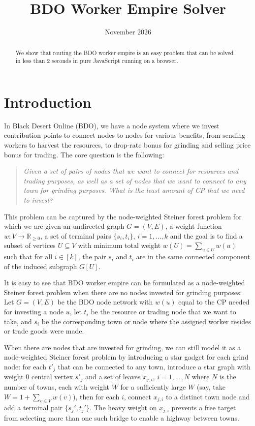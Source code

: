 \documentclass[11pt]{article}
\title{BDO Worker Empire Solver}
\date{November 2026}
\theoremstyle{definition}
\theoremstyle{remark}
\newcommand{\R}{\mathbb{R}}
\begin{document}
\maketitle

\begin{abstract}
    We show that routing the BDO worker empire is an easy problem that can be solved in less than 2 seconds in pure JavaScript running on a browser.
\end{abstract}
    

\section{Introduction}
In Black Desert Online (BDO), we have a node system where we invest contribution points to connect nodes to nodes for various benefits, from sending workers to harvest the resources, to drop-rate bonus for grinding and selling price bonus for trading. The core question is the following:

\begin{quote}
    \emph{Given a set of pairs of nodes that we want to connect for resources and trading purposes, as well as a set of nodes that we want to connect to any town for grinding purposes. What is the least amount of CP that we need to invest?}
\end{quote}

This problem can be captured by the node-weighted Steiner forest problem for which we are given an undirected graph $G = (V, E)$, a weight function $w: V \to \R_{\ge 0}$, a set of terminal pairs $\{s_i, t_i\}$, $i = 1, \dots, k$ and the goal is to find a subset of vertices $U \subseteq V$ with minimum total weight $w(U) = \sum_{u \in U} w(u)$ such that for all $i \in [k]$, the pair $s_i$ and $t_i$ are in the same connected component of the induced subgraph $G[U]$.

It is easy to see that BDO worker empire can be formulated as a node-weighted Steiner forest problem when there are no nodes invested for grinding purposes: Let $G = (V, E)$ be the BDO node network with $w(u)$ equal to the CP needed for investing a node $u$, let $t_i$ be the resource or trading node that we want to take, and $s_i$ be the corresponding town or node where the assigned worker resides or trade goods were made.

When there are nodes that are invested for grinding, we can still model it as a node-weighted Steiner forest problem by introducing a star gadget for each grind node: for each $t'_j$ that can be connected to any town, introduce a star graph with weight 0 central vertex $s'_j$ and a set of leaves $x_{j, i}$, $i = 1, \dots, N$ where $N$ is the number of towns, each with weight $W$ for a sufficiently large $W$ (say, take $W = 1 + \sum_{v \in V} w(v)$), then for each $i$, connect $x_{j, i}$ to a distinct town node and add a terminal pair $\{s_j', t_j'\}$. The heavy weight on $x_{j, i}$ prevents a free target from selecting more than one such bridge to enable a highway between towns.
\end{document}
